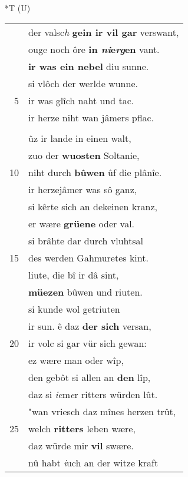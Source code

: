 \documentclass[8pt,a4paper,notitlepage]{article}
\begin{document}
\begin{table}[ht]
\begin{minipage}[t]{0.5\linewidth}
\end{minipage}
\hspace{0.5cm}
\begin{minipage}[t]{0.5\linewidth}
\small
\begin{center}*T (U)
\end{center}
\begin{tabular}{rl}
 & der valsc\textit{h} \textbf{gein ir vil gar} verswant,\\ 
 & ouge noch ôre \textbf{in \textit{ni}e\textit{rg}en} vant.\\ 
 & \textbf{ir was ein nebel} diu sunne.\\ 
 & si vlôch der werlde wunne.\\ 
5 & ir was glîch naht und tac.\\ 
 & ir herze niht wan jâmers pflac.\\ 
 & \textit{\begin{large}S\end{large}}ich zôch diu vrouwe jâmers balt\\ 
 & ûz ir lande in einen walt,\\ 
 & zuo der \textbf{wuosten} Soltanie,\\ 
10 & niht durch \textbf{bûwen} ûf die plânîe.\\ 
 & ir herzejâmer was sô ganz,\\ 
 & si kêrte sich an dekeinen kranz,\\ 
 & er wære \textbf{grüene} oder val.\\ 
 & si brâhte dar durch vluhtsal\\ 
15 & des werden Gahmuretes kint.\\ 
 & liute, die bî ir dâ sint,\\ 
 & \textbf{müezen} bûwen und riuten.\\ 
 & si kunde wol getriuten\\ 
 & ir sun. ê daz \textbf{der sich} versan,\\ 
20 & ir volc si gar vür sich gewan:\\ 
 & ez wære man oder wîp,\\ 
 & den gebôt si allen an \textbf{den} lîp,\\ 
 & daz si \textit{ie}m\textit{e}r ritters würden lût.\\ 
 & "wan vriesch daz mînes herzen trût,\\ 
25 & welch \textbf{ritters} leben wære,\\ 
 & daz würde mir \textbf{vil} swære.\\ 
 & nû habt \textit{i}uch an der witze kraft\\ 

\end{tabular}
\end{minipage}
\end{table}
\end{document}
